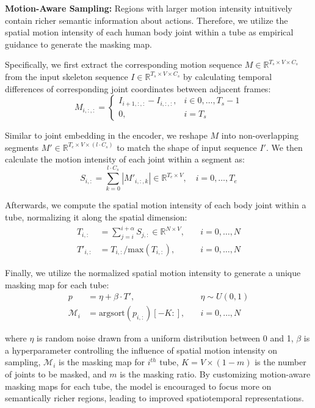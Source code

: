 \noindent \textbf{Motion-Aware Sampling:}
Regions with larger motion intensity intuitively contain richer semantic information
about actions. Therefore, we utilize the spatial motion intensity of each human body
joint within a tube as empirical guidance to generate the masking map.

Specifically, we first extract the corresponding motion sequence
$M \in \mathbb{R}^{T_{s} \times V \times C_{s}}$ from the input skeleton sequence
$I \in \mathbb{R}^{T_{s} \times V \times C_{s}}$ by calculating temporal differences
of corresponding joint coordinates between adjacent frames:
\begin{equation}
    \label{eq:motion}
    M_{i,:,:} = \begin{cases} 
    I_{i+1,:,:}-I_{i,:,:}, & i \in 0, \dots, T_{s}-1\\
    0, & i=T_{s}  
\end{cases}
\end{equation}

Similar to joint embedding in the encoder, we reshape $M$ into non-overlapping
segments $M' \in \mathbb{R}^{T_{e} \times V \times (l \cdot C_{s})}$ to match the
shape of input sequence $I'$. We then calculate the motion intensity of each joint
within a segment as:
\begin{equation}  
    \label{eq:motion_intensity}
    S_{i,:} = \sum_{k=0}^{l\cdot C_{s}}|M'_{i,:,k}| \in \mathbb{R}^{T_{e} \times V}, \quad i=0,\dots,T_{e}
\end{equation}

Afterwards, we compute the spatial motion intensity of each body joint within a tube,
normalizing it along the spatial dimension:  
\begin{equation}
    \label{eq:tube_motion_intensity_norm}
    \begin{aligned}
        T_{i,:} &= \sum_{j=i}^{i+\alpha}S_{j,:} \in \mathbb{R}^{N \times V}, \quad &i=0,\dots,N \\
        T'_{i,:} &= T_{i,:} / \text{max}(T_{i,:}), \quad &i=0,\dots,N  
    \end{aligned}
\end{equation}

Finally, we utilize the normalized spatial motion intensity to generate a unique
masking map for each tube:
\begin{equation} 
    \label{eq:mask_sampling}
    \begin{aligned}
        p &= \eta + \beta \cdot T', \quad &\eta \sim U(0,1) \\  
        \mathcal{M}_{i} &= \text{argsort}(p_{i,:})[-K:], \quad &i=0,\dots,N
    \end{aligned}
\end{equation}

\noindent where $\eta$ is random noise drawn from a uniform distribution between
0 and 1, $\beta$ is a hyperparameter controlling the influence of spatial motion
intensity on sampling, $\mathcal{M}_{i}$ is the masking map for $i^{th}$ tube,
$K=V\times (1-m)$ is the number of joints to be masked, and $m$ is the masking ratio.
By customizing motion-aware masking maps for each tube, the model is encouraged
to focus more on semantically richer regions, leading to improved spatiotemporal representations.



